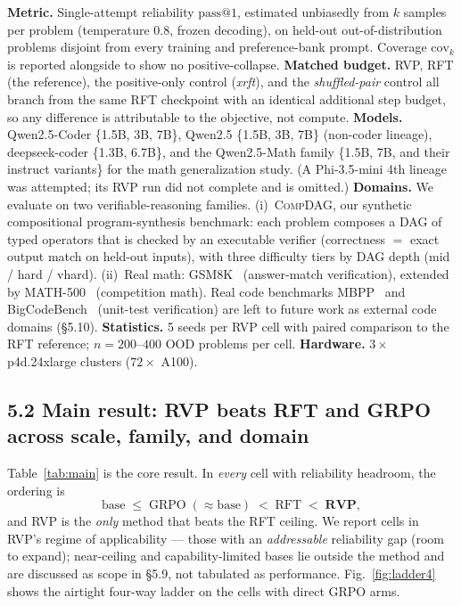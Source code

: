 \textbf{Metric.} Single-attempt reliability $\text{pass}@1$, estimated unbiasedly
from $k$ samples per problem (temperature $0.8$, frozen decoding), on held-out
out-of-distribution problems disjoint from every training and preference-bank
prompt. Coverage $\mathrm{cov}_k$ is reported alongside to show no
positive-collapse. \textbf{Matched budget.} RVP, RFT (the reference), the
positive-only control (\emph{xrft}), and the \emph{shuffled-pair} control all
branch from the same RFT checkpoint with an identical additional step budget, so
any difference is attributable to the objective, not compute. \textbf{Models.}
Qwen2.5-Coder \{1.5B, 3B, 7B\}, Qwen2.5 \{1.5B, 3B, 7B\} (non-coder lineage),
deepseek-coder \{1.3B, 6.7B\}, and the Qwen2.5-Math family \{1.5B, 7B, and their instruct
variants\} for the math generalization study. (A Phi-3.5-mini 4th lineage was attempted; its RVP run
did not complete and is omitted.)
\textbf{Domains.} We evaluate on two verifiable-reasoning families.
(i)~\textsc{CompDAG}, our synthetic compositional program-synthesis benchmark: each
problem composes a DAG of typed operators that is checked by an executable
verifier (correctness $=$ exact output match on held-out inputs), with three
difficulty tiers by DAG depth (mid / hard / vhard). (ii)~Real math:
GSM8K~\cite{cobbe2021gsm8k} (answer-match verification), extended by
MATH-500~\cite{hendrycks2021math} (competition math). Real code benchmarks
MBPP~\cite{austin2021mbpp} and BigCodeBench~\cite{zhuo2025bigcodebench}
(unit-test verification) are left to future work as external code domains (\S5.10). \textbf{Statistics.} 5 seeds per RVP cell with paired
comparison to the RFT reference; $n{=}200$--$400$ OOD problems per cell.
\textbf{Hardware.} $3\times$ p4d.24xlarge clusters ($72\times$ A100).

\subsection*{5.2 Main result: RVP beats RFT and GRPO across scale, family, and domain}

Table~\ref{tab:main} is the core result. In \emph{every} cell with reliability
headroom, the ordering is
\[
\text{base} \;\le\; \text{GRPO}\;(\approx\text{base}) \;<\; \text{RFT} \;<\; \textbf{RVP},
\]
and RVP is the \emph{only} method that beats the RFT ceiling. We report cells in
RVP's regime of applicability --- those with an \emph{addressable} reliability gap
(room to expand); near-ceiling and capability-limited bases lie outside the method
and are discussed as scope in \S5.9, not tabulated as performance.
Fig.~\ref{fig:ladder4} shows the airtight four-way ladder on the cells with direct
GRPO arms.

